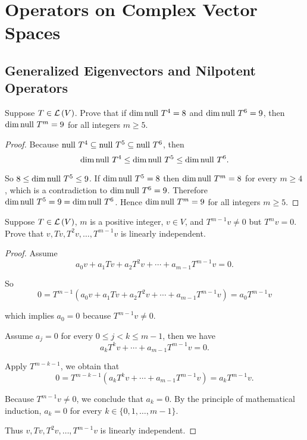 \chapter{Operators on Complex Vector Spaces}

\section{Generalized Eigenvectors and Nilpotent Operators}

\begin{exercise}\label{chapter8:sectionA:exercise1}
    Suppose $T\in\mathcal{L}\left({V}\right)$. Prove that if $\dim\operatorname{null}\,{T^{4}} = 8$ and $\dim\operatorname{null}\,{T^{6}} = 9$, then $\dim\operatorname{null}\,{T^{m}} = 9$ for all integers $m\geq 5$.
\end{exercise}

\begin{proof}
    Because $\operatorname{null}\,{T^{4}}\subseteq \operatorname{null}\,{T^{5}}\subseteq \operatorname{null}\,{T^{6}}$, then
    \[
        \dim\operatorname{null}\,{T^{4}}\leq \dim\operatorname{null}\,{T^{5}}\leq \dim\operatorname{null}\,{T^{6}}.
    \]

    So $8\leq \dim\operatorname{null}\,{T^{5}}\leq 9$. If $\dim\operatorname{null}\,{T^{5}} = 8$ then $\dim\operatorname{null}\,{T^{m}} = 8$ for every $m\geq 4$, which is a contradiction to $\dim\operatorname{null}\,{T^{6}} = 9$. Therefore $\dim\operatorname{null}\,{T^{5}} = 9 = \dim\operatorname{null}\,{T^{6}}$. Hence $\dim\operatorname{null}\,{T^{m}} = 9$ for all integers $m\geq 5$.
\end{proof}
\newpage

\begin{exercise}\label{chapter8:sectionA:exercise2}
    Suppose $T\in\mathcal{L}\left({V}\right)$, $m$ is a positive integer, $v\in V$, and $T^{m-1}v\ne 0$ but $T^{m}v = 0$. Prove that $v, Tv, T^{2}v, \ldots, T^{m-1}v$ is linearly independent.
\end{exercise}

\begin{proof}
    Assume
    \[
        a_{0}v + a_{1}Tv + a_{2}T^{2}v + \cdots + a_{m-1}T^{m-1}v = 0.
    \]

    So
    \[
        0 = T^{m-1}(a_{0}v + a_{1}Tv + a_{2}T^{2}v + \cdots + a_{m-1}T^{m-1}v) = a_{0}T^{m-1}v
    \]

    which implies $a_{0} = 0$ because $T^{m-1}v\ne 0$.

    Assume $a_{j} = 0$ for every $0\leq j < k \leq m-1$, then we have
    \[
        a_{k}T^{k}v + \cdots + a_{m-1}T^{m-1}v = 0.
    \]

    Apply $T^{m-k-1}$, we obtain that
    \[
        0 = T^{m-k-1}(a_{k}T^{k}v + \cdots + a_{m-1}T^{m-1}v) = a_{k}T^{m-1}v.
    \]

    Because $T^{m-1}v\ne 0$, we conclude that $a_{k} = 0$. By the principle of mathematical induction, $a_{k} = 0$ for every $k\in\{0,1,\ldots,m-1\}$.

    Thus $v, Tv, T^{2}v, \ldots, T^{m-1}v$ is linearly independent.
\end{proof}
\newpage

